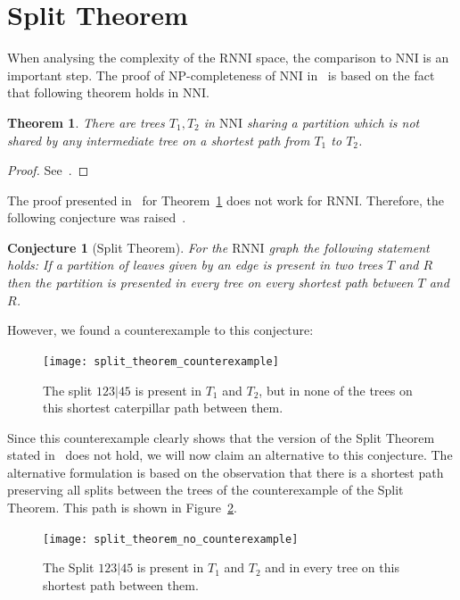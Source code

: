 \documentclass[11pt, a4paper]{article}
\newcommand{\nni}{\mathrm{NNI}}
\newcommand{\rnni}{\mathrm{RNNI}}
\newtheorem{theorem}[definition]{Theorem}
\newtheorem{conjecture}[definition]{Conjecture}
\begin{document}
\section{Split Theorem}

When analysing the complexity of the $\rnni$ space, the comparison to $\nni$ is an important step.
The proof of NP-completeness of $\nni$ in~\cite{jiang2000} is based on the fact that following theorem holds in $\nni$.

\begin{theorem}
	There are trees $T_1,T_2$ in $\nni$ sharing a partition which is not shared by any intermediate tree on a shortest path from $T_1$ to $T_2$.
	\label{thm:split_nni}
\end{theorem}

\begin{proof}
	See~\cite{Li1996}.
\end{proof}

The proof presented in~\cite{Li1996} for Theorem~\ref{thm:split_nni} does not work for $\rnni$. 
Therefore, the following conjecture was raised~\cite{Gavryushkin2017}.

\begin{conjecture}[Split Theorem]
	For the $\rnni$ graph the following statement holds:
	If a partition of leaves given by an edge is present in two trees $T$ and $R$ then the partition is presented in every tree on every shortest path between $T$ and $R$.
	\label{split_theorem}
\end{conjecture}

However, we found a counterexample to this conjecture:

\begin{figure}[H]
	\centering
	\texttt{[image: split\_theorem\_counterexample]}
	\caption{The split $123|45$ is present in $T_1$ and $T_2$, but in none of the trees on this shortest caterpillar path between them.}
	\label{split_theorem_counterexample}
\end{figure}

Since this counterexample clearly shows that the version of the Split Theorem stated in~\cite{Gavryushkin2017} does not hold, we will now claim an alternative to this conjecture.
The alternative formulation is based on the observation that there is a shortest path preserving all splits between the trees of the counterexample of the Split Theorem.
This path is shown in Figure~\ref{split_theorem_no_counterexample}.

\begin{figure}[H]
	\centering
	\texttt{[image: split\_theorem\_no\_counterexample]}
	\caption{The Split $123|45$ is present in $T_1$ and $T_2$ and in every tree on this shortest path between them.}
	\label{split_theorem_no_counterexample}
\end{figure}
\end{document}
